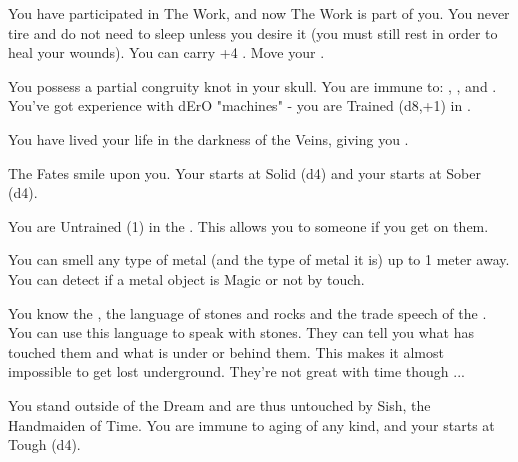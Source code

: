 \begin{multicols*}{2}
{{      \myskip

        You have participated in The Work, and now The Work is part of you.  You never tire and do not need to sleep unless you desire it (you must still rest in order to heal your wounds). You can carry +4 . Move your \TAL \DCUP.

      \myskip

        You possess a partial congruity knot in your skull.  You are immune to: , , and . You've got experience with dErO "machines" - you are Trained (d8,+1) in .

}}

\cbreak



  You have lived your life in the darkness of the Veins, giving you .



  The Fates smile upon you. Your \INJURY starts at Solid (d4) and your \INSANITY starts at Sober (d4). 



    You are Untrained (1) in the . This allows you to  someone if you get  on them.



  You can smell any type of metal (and the type of metal it is) up to 1 meter away. You can detect if a metal object is Magic or not by touch.


  You know the , the language of stones and rocks and the trade speech of the .  You can use this language to speak with stones. They can tell you what has touched them and what is under or behind them.  This makes it almost impossible to get lost underground. They're not great with time though ...


  You stand outside of the Dream and are thus untouched by Sish, the Handmaiden of Time. You are immune to aging of any kind, and your \DEATH starts at Tough (d4).


\end{multicols*}
